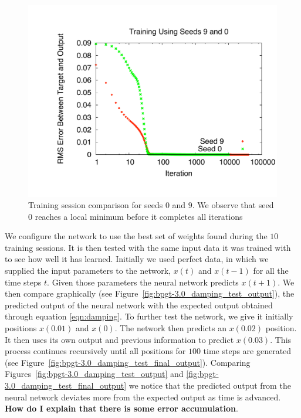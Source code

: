 \documentclass[11pt]{article}
\begin{document}
\begin{figure}[htbp]
	\centering
		\includegraphics[width=0.85\columnwidth]{../bpgt-3.0/damping_test/Trainings.pdf}
	\caption{Training session comparison for seeds $0$ and $9$. We observe that seed $0$ reaches a local minimum before it completes all iterations}
	\label{fig:bpgt-3.0_damping_test_Trainings}
\end{figure}

We configure the network to use the best set of weights found during the $10$ training sessions. It is then tested with the same input
data it was trained with to see how well it has learned. Initially we used perfect data, in which we supplied the input parameters to
the network, $x(t)$ and $x(t-1)$ for all the time steps $t$. Given those parameters the neural network predicts $x(t+1)$. We then
compare graphically (see Figure~\ref{fig:bpgt-3.0_damping_test_output}), the predicted output of the neural network with the expected
output obtained through equation \ref{eqn:damping}. To further test the network, we give it initially positions $x(0.01)$ and $x(0)$.
The network then predicts an $x(0.02)$ position. It then uses its own output and previous information to predict $x(0.03)$. This process
continues recursively until all positions for $100$ time steps are generated (see Figure~\ref{fig:bpgt-3.0_damping_test_final_output}).
Comparing Figures~\ref{fig:bpgt-3.0_damping_test_output} and \ref{fig:bpgt-3.0_damping_test_final_output} we notice that the predicted
output from the neural network deviates more from the expected output as time is advanced. \textbf{How do I explain that there is some
error accumulation}.
\end{document}
